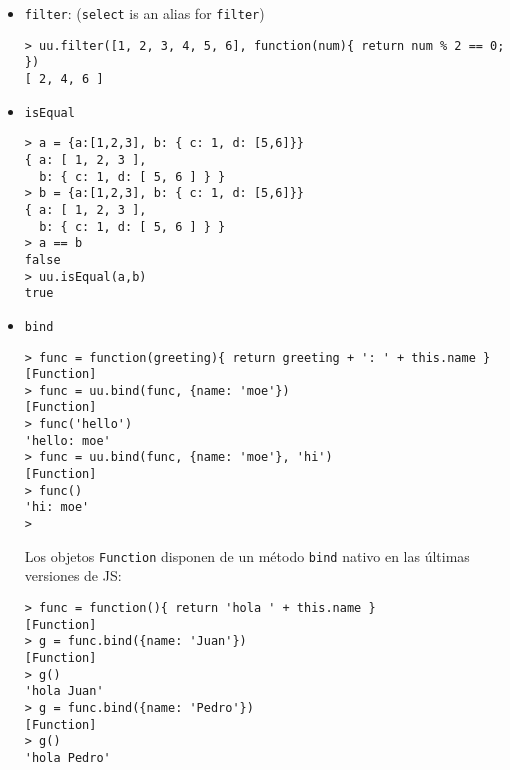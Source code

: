 \begin{itemize}
\begin{itemize}
\item \verb|filter|: (\verb|select| is an alias for \verb|filter|)
\begin{verbatim}
> uu.filter([1, 2, 3, 4, 5, 6], function(num){ return num % 2 == 0; })
[ 2, 4, 6 ]
\end{verbatim}
\item \verb|isEqual|
\begin{verbatim}
> a = {a:[1,2,3], b: { c: 1, d: [5,6]}}
{ a: [ 1, 2, 3 ],
  b: { c: 1, d: [ 5, 6 ] } }
> b = {a:[1,2,3], b: { c: 1, d: [5,6]}}
{ a: [ 1, 2, 3 ],
  b: { c: 1, d: [ 5, 6 ] } }
> a == b
false
> uu.isEqual(a,b)
true
\end{verbatim}
\item \verb|bind|
\begin{verbatim}
> func = function(greeting){ return greeting + ': ' + this.name }
[Function]
> func = uu.bind(func, {name: 'moe'})
[Function]
> func('hello')
'hello: moe'
> func = uu.bind(func, {name: 'moe'}, 'hi')
[Function]
> func()
'hi: moe'
> 
\end{verbatim}
Los objetos \verb|Function| disponen de un método \verb|bind|
nativo en las últimas versiones de JS:
\begin{verbatim}
> func = function(){ return 'hola ' + this.name }
[Function]
> g = func.bind({name: 'Juan'})
[Function]
> g()
'hola Juan'
> g = func.bind({name: 'Pedro'})
[Function]
> g()
'hola Pedro'
\end{verbatim}
\end{itemize}
\end{itemize}


